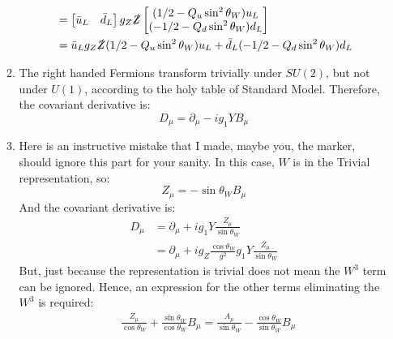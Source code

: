 \documentclass[12pt,a4]{article}
\begin{document}
\begin{enumerate}
\begin{enumerate}
\begin{align*}
                                      &= \left[\begin{matrix} \bar{u}_L & \bar{d}_L \end{matrix}\right]  g_Z \slashed{Z} \left[\begin{matrix} (1/2 - Q_u\sin^2 \theta_W) u_L \\ (-1/2 - Q_d \sin^2 \theta_W) d_L \end{matrix}  \right] \\
                                      &= \bar{u}_L g_Z \slashed{Z}  (1/2 - Q_u\sin^2 \theta_W) u_L + \bar{d}_L  (- 1/2 - Q_d \sin^2 \theta_W) d_L \\
        \end{align*}
      \item
        The right handed Fermions transform trivially under $SU(2)$, but not under $U(1)$, according to the holy table of Standard Model.
        Therefore, the covariant derivative is:
        \begin{equation*}
          D_\mu = \partial_\mu - i g_1 Y B_\mu
        \end{equation*}
      \item
        Here is an instructive mistake that I made, maybe you, the marker, should ignore this part for your sanity.
        In this case, $W$ is in the Trivial representation, so:
        \begin{equation*}
          Z_\mu = - \sin \theta_W B_\mu
        \end{equation*}
        And the covariant derivative is:
        \begin{align*}
          D_\mu &= \partial_\mu + i g_1 Y \frac{Z_\mu}{\sin \theta_W } \\
                &= \partial_\mu + i g_Z \frac{\cos \theta_W}{g^2} g_1 Y \frac{Z_\mu}{\sin \theta_W } 
        \end{align*}
        But, just because the representation is trivial does not mean the $W^3$ term can be ignored.
        Hence, an expression for the other terms eliminating the $W^3$ is required:
        \begin{align*}
                          & \frac{Z_\mu}{\cos \theta_W} + \frac{\sin \theta_W}{\cos \theta_W} B_\mu=  \frac{A_\mu}{\sin \theta_W} - \frac{\cos \theta_W}{\sin \theta_W} B_\mu\\

\end{align*}
\end{enumerate}
\end{enumerate}
\end{document}

